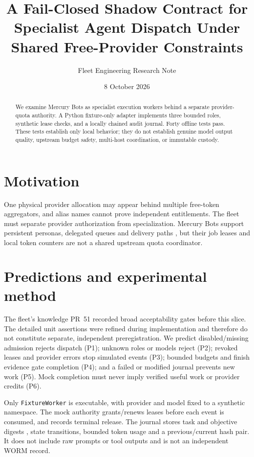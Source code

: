 \documentclass[11pt]{article}
\title{A Fail-Closed Shadow Contract for Specialist Agent Dispatch Under Shared Free-Provider Constraints}
\author{Fleet Engineering Research Note}
\date{8 October 2026}
\begin{document}
\maketitle
\begin{abstract}
We examine Mercury Bots as specialist execution workers behind a separate provider-quota authority. A Python fixture-only adapter implements three bounded roles, synthetic lease checks, and a locally chained audit journal. Forty offline tests pass. These tests establish only local behavior; they do not establish genuine model output quality, upstream budget safety, multi-host coordination, or immutable custody.
\end{abstract}

\section{Motivation}
One physical provider allocation may appear behind multiple free-token aggregators, and alias names cannot prove independent entitlements. The fleet must separate provider authorization from specialization. Mercury Bots support persistent personas, delegated queues and delivery paths \cite{mercury}, but their job leases and local token counters are not a shared upstream quota coordinator.

\section{Predictions and experimental method}
The fleet's knowledge PR~51 recorded broad acceptability gates before this slice. The detailed unit assertions were refined during implementation and therefore do not constitute separate, independent preregistration. We predict disabled/missing admission rejects dispatch (P1); unknown roles or models reject (P2); revoked leases and provider errors stop simulated events (P3); bounded budgets and finish evidence gate completion (P4); and a failed or modified journal prevents new work (P5). Mock completion must never imply verified useful work or provider credits (P6).

Only \texttt{FixtureWorker} is executable, with provider and model fixed to a synthetic namespace. The mock authority grants/renews leases before each event is consumed, and records terminal release. The journal stores task and objective digests \cite{nist}, state transitions, bounded token usage and a previous/current hash pair. It does not include raw prompts or tool outputs and is not an independent WORM record.
\end{document}

